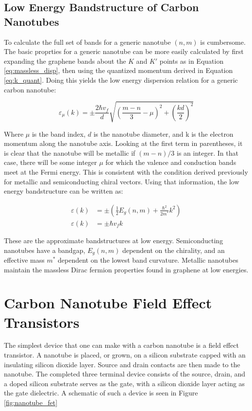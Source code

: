 \subsection{Low Energy Bandstructure of Carbon Nanotubes}

To calculate the full set of bands for a generic nanotube $(n,m)$ is cumbersome. The basic proprties for a generic nanotube can be more easily calculated by first expanding the graphene bands about the $K$ and $K'$ points as in Equation \ref{eq:massless_disp}, then using the quantized momentum derived in Equation \ref{eq:k_quant}. Doing this yields the low energy dispersion relation for a generic carbon nanotube:

\begin{equation}
    \varepsilon_{\mu}(k) = \pm\frac{2\hbar v_f}{d}\sqrt{\left(\frac{m-n}{3} - \mu\right)^2 + \left(\frac{kd}{2}\right)^2}
    \label{eq:low_e_cnt}
\end{equation}

Where $\mu$ is the band index, $d$ is the nanotube diameter, and k is the electron momentum along the nanotube axis. Looking at the first term in parentheses, it is clear that the nanotube will be metallic if $(m-n)/3$ is an integer. In that case, there will be some integer $\mu$ for which the valence and conduction bands meet at the Fermi energy. This is consistent with the condition derived previously for metallic and semiconducting chiral vectors. Using that information, the low energy bandstructure can be written as:

\begin{align}
    \varepsilon(k) &= \pm\left(\frac{1}{2}E_g(n,m) + \frac{\hbar^2}{2m^*}k^2\right) \\
    \varepsilon(k) &= \pm\hbar v_f k
\end{align}

These are the approximate bandstructures at low energy. Semiconducting nanotubes have a bandgap, $E_g(n,m)$ dependent on the chirality, and an effective mass $m^*$ dependent on the lowest band curvature. Metallic nanotubes maintain the massless Dirac fermion properties found in graphene at low energies.

\section{Carbon Nanotube Field Effect Transistors}

The simplest device that one can make with a carbon nanotube is a field effect transistor. A nanotube is placed, or grown, on a silicon substrate capped with an insulating silicon dioxide layer. Source and drain contacts are then made to the nanotube. The completed three terminal device consists of the source, drain, and a doped silicon substrate serves as the gate, with a silicon dioxide layer acting as the gate dielectric. A schematic of such a device is seen in Figure \ref{fig:nanotube_fet}

